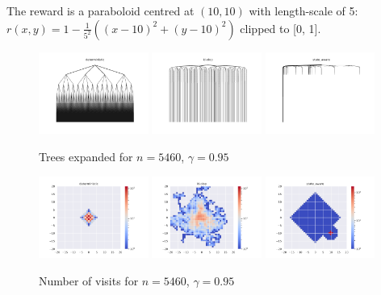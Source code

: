 \documentclass[runningheads]{llncs}
\begin{document}
The reward is a paraboloid centred at $(10, 10)$ with length-scale of 5:  $r(x, y) = 1 - \frac{1}{5^2}((x-10)^2 + (y-10)^2)$ clipped to [0, 1].

\begin{figure}[H]
    \centering
    \includegraphics[width=0.32\textwidth]{img/4_deterministic.pdf}
    \includegraphics[width=0.32\textwidth]{img/4_kl-olop.pdf}
    \includegraphics[width=0.32\textwidth]{img/4_state_aware.pdf}
    \caption{Trees expanded for $n = 5460$, $\gamma=0.95$}
    \label{fig:gw4_trees}
\end{figure}
\begin{figure}[H]
    \centering
    \includegraphics[width=0.32\textwidth]{img/4_occupations_deterministic.pdf}
    \includegraphics[width=0.32\textwidth]{img/4_occupations_kl-olop.pdf}
    \includegraphics[width=0.32\textwidth]{img/4_occupations_state_aware.pdf}
    \caption{Number of visits for $n = 5460$, $\gamma=0.95$}
    \label{fig:gw4_visits}
\end{figure}
\end{document}
